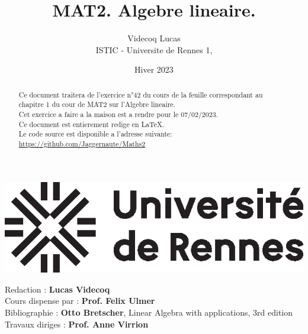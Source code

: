 \documentclass{config/homework}
\title{\fontfamily{phv}\selectfont MAT2. Algebre lineaire.}
\date{Hiver 2023}
\author{Videcoq Lucas \\ ISTIC - Universite de Rennes 1, \textit{\thedate}}
\begin{document}
    \begin{titlepage}

        \maketitle

        \begin{abstract}
            Ce document traitera de l'exercice n°42 du cours de la feuille correspondant
            au chapitre 1 du cour de MAT2 sur l'Algebre lineaire. \\
            Cet exercice a faire a la maison est a rendre pour le 07/02/2023.\\
            Ce document est entierement redige en LaTeX. \\
            Le code source est disponible a l'adresse suivante: \url{https://github.com/Jaggernaute/Maths2}
        \end{abstract}
        \vspace{5em}
        \center\includegraphics{images/univ-logo}

        \newpage

        \tableofcontents

        \vspace{5em}

        \begin{contributors}
            \vspace{.25em}
            Redaction : \textbf{Lucas Videcoq} \\
            Cours dispense par : \textbf{Prof. Felix Ulmer} \\
            Bibliographie : \textbf{Otto Bretscher}, Linear Algebra with applications,
            3rd edition \\
            Travaux diriges : \textbf{Prof. Anne Virrion} \\
            \vspace{.25em}
        \end{contributors}

    \end{titlepage}
\end{document}
